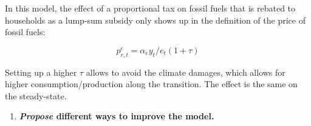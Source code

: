 \documentclass[
  letterpaper,
  DIV=11,
  numbers=noendperiod]{scrartcl}
\providecommand{\tightlist}{%
  \setlength{\itemsep}{0pt}\setlength{\parskip}{0pt}}\usepackage{longtable,booktabs,array}
\begin{document}
In this model, the effect of a proportional tax on fossil fuels that is
rebated to households as a lump-sum subsidy only shows up in the
definition of the price of fossil fuels:

\[p^e_{r,t} = \alpha_e y_t / e_t (1+\tau)\]

Setting up a higher \(\tau\) allows to avoid the climate damages, which
allows for higher consumption/production along the transition. The
effect is the same on the steady-state.

\begin{enumerate}
\def\labelenumi{\arabic{enumi}.}
\setcounter{enumi}{14}
\tightlist
\item
  \textbf{\emph{Propose} different ways to improve the model.}
\end{enumerate}
\end{document}
